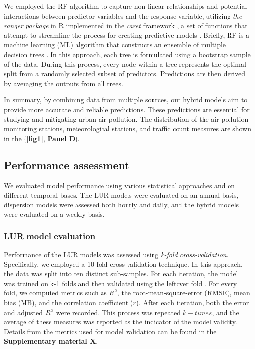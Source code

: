 \documentclass{article}
\begin{document}
We employed the RF algorithm to capture non-linear relationships and potential interactions between predictor variables and the response variable, utilizing \textit{the ranger package} in R implemented in the \textit{caret} framework \cite{wright2019}, a set of functions that attempt to streamline the process for creating predictive models \cite{caret2008}. Briefly, RF is a machine learning (ML) algorithm that constructs an ensemble of multiple decision trees \cite{breiman2001}. In this approach, each tree is formulated using a bootstrap sample of the data. During this process, every node within a tree represents the optimal split from a randomly selected subset of predictors. Predictions are then derived by averaging the outputs from all trees.

In summary, by combining data from multiple sources, our hybrid models aim to provide more accurate and reliable predictions. These predictions are essential for studying and mitigating urban air pollution. The distribution of the air pollution monitoring stations, meteorological stations, and traffic count measures are shown in the (\textbf{\cref{fig1}}, \textbf{Panel D}). 

\subsection{Performance assessment}

We evaluated model performance using various statistical approaches and on different temporal bases. The LUR models were evaluated on an annual basis, dispersion models were assessed both hourly and daily, and the hybrid models were evaluated on a weekly basis.

\subsubsection{LUR model evaluation}
Performance of the LUR models was assessed using \textit{k-fold cross-validation}. Specifically, we employed a 10-fold cross-validation technique. In this approach, the data was split into ten distinct sub-samples. For each iteration, the model was trained on k-1 folds and then validated using the leftover fold \cite{ziegel2003}. For every fold, we computed metrics such as \(R^2\), the root-mean-square-error (RMSE), mean bias (MB), and the correlation coefficient (\(r\)). After each iteration, both the error and adjusted \(R\textsuperscript{2}\) were recorded. This process was repeated \(k-times\), and the average of these measures was reported as the indicator of the model validity. Details from the metrics used for model validation can be found in the \textbf{Supplementary material X}.\\
\end{document}
